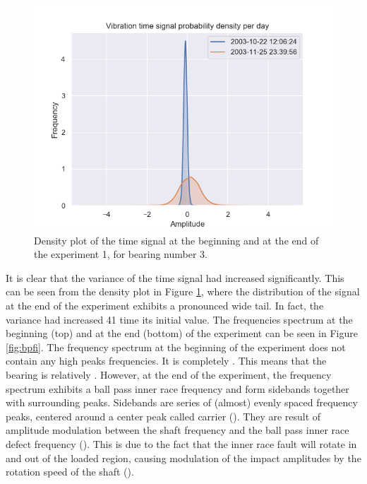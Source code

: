 \documentclass[../Main/thesis.tex]{subfiles}
\begin{document}
\begin{figure}[H]
	\centering
	\includegraphics[width=0.7\linewidth]{../fig/bpfi/bpfi_density}
	\caption{Density plot of the time signal at the beginning and at the end of the experiment 1, for bearing number 3.}
	\label{fig:bpfi_density}
\end{figure}
\justify
It is clear that the variance of the time signal had increased significantly. This can be seen from the density plot in Figure \ref{fig:bpfi_density}, where the distribution of the signal at the end of the experiment exhibits a pronounced wide tail. In fact, the variance had increased 41 time its initial value. The frequencies spectrum at the beginning (top) and at the end (bottom) of the experiment can be seen in Figure \ref{fig:bpfi}. The frequency spectrum at the beginning of the experiment does not contain any high peaks frequencies. It is completely . This means that the bearing is relatively .
\justify
However, at the end of the experiment, the frequency spectrum exhibits a ball pass inner race frequency and form sidebands together with surrounding peaks.
Sidebands are series of (almost) evenly spaced frequency peaks, centered around a center peak called carrier (\cite{mobius2014}).
They are result of amplitude modulation between the shaft frequency and the ball pass inner race defect frequency (\cite{mobius2014}). This is due to the fact that the inner race fault will rotate in and out of the loaded region, causing modulation of the impact amplitudes by the rotation speed of the shaft (\cite{courrech}).
\end{document}
